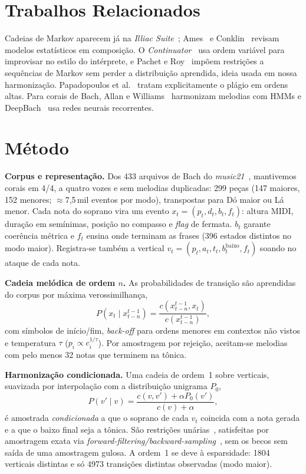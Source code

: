 \documentclass{article}
\begin{document}
\section{Trabalhos Relacionados}\label{sec:related}
Cadeias de Markov aparecem já na \textit{Illiac Suite}~\cite{hiller1959}; Ames~\cite{ames1989} e Conklin~\cite{conklin2003} revisam modelos estatísticos em composição. O \textit{Continuator}~\cite{pachet2003} usa ordem variável para improvisar no estilo do intérprete, e Pachet e Roy~\cite{pachet2011} impõem restrições a sequências de Markov sem perder a distribuição aprendida, ideia usada em nossa harmonização. Papadopoulos et al.~\cite{papadopoulos2014} tratam explicitamente o plágio em ordens altas. Para corais de Bach, Allan e Williams~\cite{allan2005} harmonizam melodias com HMMs e DeepBach~\cite{hadjeres2017} usa redes neurais recorrentes.

\section{Método}\label{sec:method}
\textbf{Corpus e representação.} Dos 433 arquivos de Bach do \textit{music21}~\cite{cuthbert2010}, mantivemos corais em 4/4, a quatro vozes e sem melodias duplicadas: 299 peças (147 maiores, 152 menores; $\approx$7{,}5\,mil eventos por modo), transpostas para Dó maior ou Lá menor. Cada nota do soprano vira um evento $x_t=(p_t,d_t,b_t,f_t)$: altura MIDI, duração em semínimas, posição no compasso e \textit{flag} de fermata. $b_t$ garante coerência métrica e $f_t$ ensina onde terminam as frases (396 estados distintos no modo maior). Registra-se também a vertical $v_t=(p_t,a_t,t_t,b^{\text{baixo}}_t,f_t)$ soando no ataque de cada nota.

\textbf{Cadeia melódica de ordem $n$.} As probabilidades de transição são aprendidas do corpus por máxima verossimilhança,
\begin{equation}
P(x_t\mid x_{t-n}^{t-1}) = \frac{c(x_{t-n}^{t-1},x_t)}{c(x_{t-n}^{t-1})},
\end{equation}
com símbolos de início/fim, \textit{back-off} para ordens menores em contextos não vistos e temperatura $\tau$ ($p_i\propto c_i^{1/\tau}$). Por amostragem por rejeição, aceitam-se melodias com pelo menos 32 notas que terminem na tônica.

\textbf{Harmonização condicionada.} Uma cadeia de ordem~1 sobre verticais, suavizada por interpolação com a distribuição unigrama $P_0$,
\begin{equation}
P(v'\mid v)=\frac{c(v,v')+\alpha P_0(v')}{c(v)+\alpha},
\end{equation}
é amostrada \emph{condicionada} a que o soprano de cada $v_t$ coincida com a nota gerada e a que o baixo final seja a tônica. São restrições unárias~\cite{pachet2011}, satisfeitas por amostragem exata via \textit{forward-filtering/backward-sampling}~\cite{carter1994}, sem os becos sem saída de uma amostragem gulosa. A ordem~1 se deve à esparsidade: 1804 verticais distintas e só 4973 transições distintas observadas (modo maior).
\end{document}
